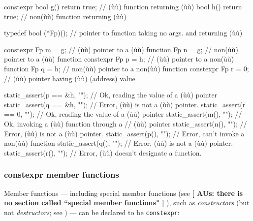 \begin{emcppslisting}
constexpr bool g() { return true; }  //    (ù{}ù) function returning (ù{}ù)
          bool h() { return true; }  // non(ù{}ù) function returning (ù{}ù)

typedef bool (*Fp)();  // pointer to function taking no args. and returning (ù{}ù)

constexpr Fp m = g;  //    (ù{}ù) pointer to a    (ù{}ù) function
          Fp n = g;  // non(ù{}ù) pointer to a    (ù{}ù) function
constexpr Fp p = h;  //    (ù{}ù) pointer to a non(ù{}ù) function
          Fp q = h;  // non(ù{}ù) pointer to a non(ù{}ù) function
constexpr Fp r = 0;  //    (ù{}ù) pointer having (ù{}ù) (address) value

static_assert(p == &h, "");  // Ok, reading the value of a (ù{}ù) pointer
static_assert(q == &h, "");  // Error, (ù{}ù) is not a (ù{}ù) pointer.
static_assert(r == 0,  "");  // Ok, reading the value of a (ù{}ù) pointer
static_assert(m(), "");      // Ok, invoking a (ù{}ù) function through a
                             //     (ù{}ù) pointer
static_assert(n(), "");      // Error, (ù{}ù) is not a (ù{}ù) pointer.
static_assert(p(), "");      // Error, can't invoke a non(ù{}ù) function
static_assert(q(), "");      // Error, (ù{}ù) is not a (ù{}ù) pointer.
static_assert(r(), "");      // Error, (ù{}ù) doesn't designate a function.
\end{emcppslisting}
    

\subsubsection[\lstinline!constexpr! member functions]{{\SubsubsecCode constexpr} member functions}\label{constexpr-member-functions}

Member functions --- including special member functions (see
\intrarefsimple{}\textbf{[ AUs: there is no section called ``special member functions" ] }), such as
\emph{constructors} (but not \emph{destructors}; see ) --- can be declared to be
\lstinline!constexpr!:


